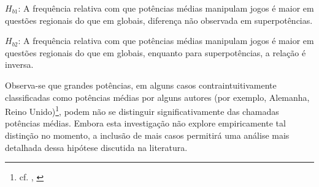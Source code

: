 \documentclass[]{interact}
\theoremstyle{plain}%
\theoremstyle{definition}
\theoremstyle{remark}
\begin{document}
\(H_{b1}\): A frequência relativa com que potências médias manipulam
jogos é maior em questões regionais do que em globais, diferença não
observada em superpotências.

\(H_{b2}\): A frequência relativa com que potências médias manipulam
jogos é maior em questões regionais do que em globais, enquanto para
superpotências, a relação é inversa.

Observa-se que grandes potências, em alguns casos contraintuitivamente
classificadas como potências médias por alguns autores (por exemplo,
Alemanha, Reino Unido)\footnote{cf. \citet{trommer_17}, \citet{otte_99}},
podem não se distinguir significativamente das chamadas potências
médias. Embora esta investigação não explore empiricamente tal distinção
no momento, a inclusão de mais casos permitirá uma análise mais
detalhada dessa hipótese discutida na literatura.






\end{document}
